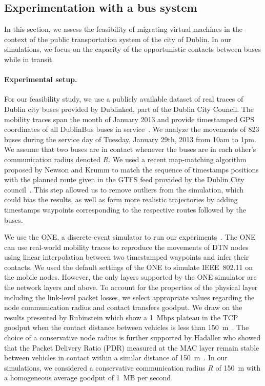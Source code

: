 \subsection{Experimentation with a bus system}

In this section, we assess the feasibility of migrating virtual machines in the context of the public transportation system of the city of Dublin.  In our simulations, we focus on the capacity of the opportunistic contacts between buses while in transit.

\paragraph{Experimental setup.} 
For our feasibility study, we use a publicly available dataset of real traces of Dublin city buses provided by Dublinked, part of the Dublin City Council. The mobility traces span the month of January 2013 and provide timestamped GPS coordinates of all DublinBus buses in service~\cite{dublinked}. We analyze the movements of 823 buses during the service day of Tuesday, January 29th, 2013 from 10am to 1pm. We assume that two buses are in contact whenever the buses are in each other's communication radius denoted $R$. We used a recent map-matching algorithm proposed by Newson and Krumm to match the sequence of timestamps positions with the planned route given in the GTFS feed provided by the Dublin City council~\cite{newson2009hidden}. This step allowed us to remove outliers from the simulation, which could bias the results, as well as form more realistic trajectories by adding timestamps waypoints corresponding to the respective routes followed by the buses.

We use the ONE, a discrete-event simulator to run our experiments~\cite{keranen2009one}. The ONE can use real-world mobility traces to reproduce the movements of DTN nodes using linear interpolation between two timestamped waypoints and infer their contacts. We used the default settings of the ONE to simulate IEEE~802.11 on the mobile nodes. However, the only layers supported by the ONE simulator are the network layers and above. To account for the properties of the physical layer including the link-level packet losses, we select appropriate values regarding the node communication radius and contact transfers goodput. We draw on the results presented by Rubinstein \etal which show a 1~Mbps plateau in the TCP goodput when the contact distance between vehicles is less than 150~m~\cite{rubinstein2009measuring}. The choice of a conservative node radius is further supported by Hadaller \etal who showed that the Packet Delivery Ratio (PDR) measured at the MAC layer remain stable between vehicles in contact within a similar distance of 150~m~\cite{hadaller2007vehicular}. In our simulations, we considered a conservative communication radius $R$ of 150~m with a homogeneous average goodput of 1~MB per second. 

